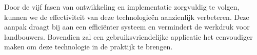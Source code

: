 \documentclass{hogent-article}
\begin{document}
Door de vijf fasen van ontwikkeling en implementatie zorgvuldig te volgen, kunnen we de effectiviteit van deze technologieën aanzienlijk verbeteren. Deze aanpak draagt bij aan een efficiënter systeem en vermindert de werkdruk voor landbouwers. Bovendien zal een gebruiksvriendelijke applicatie het eenvoudiger maken om deze technologie in de praktijk te brengen.


\printbibliography[heading=bibintoc]
\end{document}
